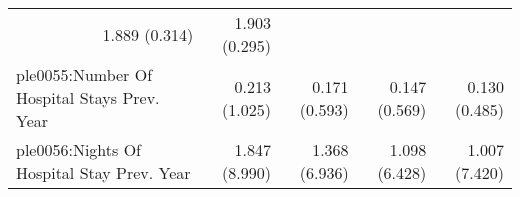 \documentclass{article}
\begin{document}
\begin{table}[!h]
\begin{tabular}{lllll}
  \multicolumn{1}{r}{1.889 (0.314)} &
  \multicolumn{1}{r}{1.903 (0.295)} \\
\multicolumn{1}{l}{ple0055:Number Of Hospital Stays Prev. Year} &
  \multicolumn{1}{r}{0.213 (1.025)} &
  \multicolumn{1}{r}{0.171 (0.593)} &
  \multicolumn{1}{r}{0.147 (0.569)} &
  \multicolumn{1}{r}{0.130 (0.485)} \\
\multicolumn{1}{l}{ple0056:Nights Of Hospital Stay Prev. Year} &
  \multicolumn{1}{r}{1.847 (8.990)} &
  \multicolumn{1}{r}{1.368 (6.936)} &
  \multicolumn{1}{r}{1.098 (6.428)} &
  \multicolumn{1}{r}{1.007 (7.420)} \\
\cline{1-5}
\end{tabular}
\end{table}
\end{document}
